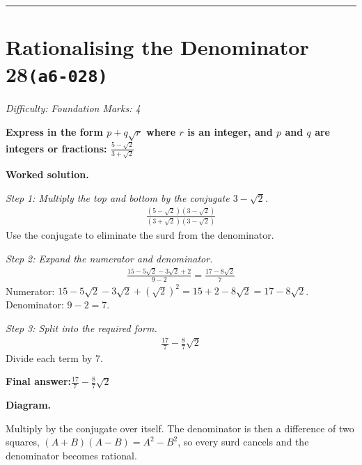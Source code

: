 \documentclass[11pt]{article}
\newcommand{\question}[1]{\par\medskip\noindent\textbf{#1}\par}
\begin{document}
\medskip\hrule

\section*{Rationalising the Denominator 28\quad\small\texttt{(a6-028)}}
\textit{Difficulty: Foundation \quad\textbar\quad Marks: 4}

\question{Express in the form \( p + q\sqrt{r} \) where \( r \) is an integer, and \( p \) and \( q \) are integers or fractions: \( \frac{5 - \sqrt{2}}{3 + \sqrt{2}} \)}

\textbf{Worked solution.}

\textit{Step 1: Multiply the top and bottom by the conjugate \( 3 - \sqrt{2} \).}
\[\begin{gathered}
\frac{(5 - \sqrt{2})(3 - \sqrt{2})}{(3 + \sqrt{2})(3 - \sqrt{2})}
\end{gathered}\]
Use the conjugate to eliminate the surd from the denominator.

\textit{Step 2: Expand the numerator and denominator.}
\[\begin{gathered}
\frac{15 - 5\sqrt{2} - 3\sqrt{2} + 2}{9 - 2} = \frac{17 - 8\sqrt{2}}{7}
\end{gathered}\]
Numerator: \( 15 - 5\sqrt{2} - 3\sqrt{2} + (\sqrt{2})^2 = 15 + 2 - 8\sqrt{2} = 17 - 8\sqrt{2} \). Denominator: \( 9 - 2 = 7 \).

\textit{Step 3: Split into the required form.}
\[\begin{gathered}
\frac{17}{7} - \frac{8}{7}\sqrt{2}
\end{gathered}\]
Divide each term by 7.

\begin{answerbox}
\textbf{Final answer:}\quad \(\displaystyle \frac{17}{7} - \frac{8}{7}\sqrt{2}\)
\end{answerbox}
\textbf{Diagram.}

\begin{center}
\end{center}
\small Multiply by the conjugate over itself. The denominator is then a difference of two squares, $(A+B)(A-B)=A^{2}-B^{2}$, so every surd cancels and the denominator becomes rational.\normalsize
\end{document}
